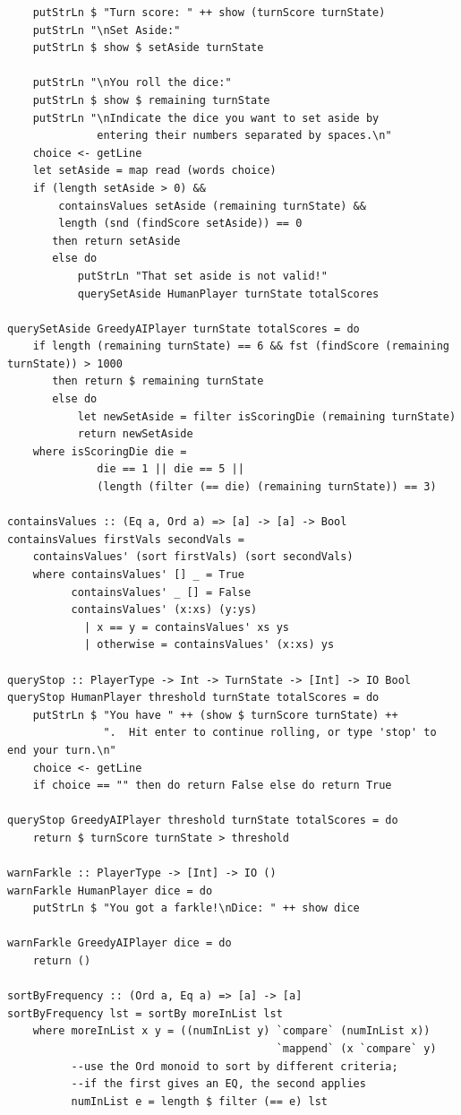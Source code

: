 \documentclass{article}
\begin{document}
\begin{lstlisting}
    putStrLn $ "Turn score: " ++ show (turnScore turnState)
    putStrLn "\nSet Aside:"
    putStrLn $ show $ setAside turnState

    putStrLn "\nYou roll the dice:"
    putStrLn $ show $ remaining turnState
    putStrLn "\nIndicate the dice you want to set aside by
              entering their numbers separated by spaces.\n"
    choice <- getLine
    let setAside = map read (words choice)
    if (length setAside > 0) &&
        containsValues setAside (remaining turnState) &&
        length (snd (findScore setAside)) == 0
       then return setAside
       else do
           putStrLn "That set aside is not valid!"
           querySetAside HumanPlayer turnState totalScores

querySetAside GreedyAIPlayer turnState totalScores = do
    if length (remaining turnState) == 6 && fst (findScore (remaining turnState)) > 1000
       then return $ remaining turnState
       else do
           let newSetAside = filter isScoringDie (remaining turnState)
           return newSetAside
    where isScoringDie die =
              die == 1 || die == 5 ||
              (length (filter (== die) (remaining turnState)) == 3)

containsValues :: (Eq a, Ord a) => [a] -> [a] -> Bool
containsValues firstVals secondVals =
    containsValues' (sort firstVals) (sort secondVals)
    where containsValues' [] _ = True
          containsValues' _ [] = False
          containsValues' (x:xs) (y:ys)
            | x == y = containsValues' xs ys
            | otherwise = containsValues' (x:xs) ys
    
queryStop :: PlayerType -> Int -> TurnState -> [Int] -> IO Bool
queryStop HumanPlayer threshold turnState totalScores = do
    putStrLn $ "You have " ++ (show $ turnScore turnState) ++
               ".  Hit enter to continue rolling, or type 'stop' to end your turn.\n"
    choice <- getLine
    if choice == "" then do return False else do return True

queryStop GreedyAIPlayer threshold turnState totalScores = do
    return $ turnScore turnState > threshold

warnFarkle :: PlayerType -> [Int] -> IO ()
warnFarkle HumanPlayer dice = do
    putStrLn $ "You got a farkle!\nDice: " ++ show dice

warnFarkle GreedyAIPlayer dice = do
    return ()

sortByFrequency :: (Ord a, Eq a) => [a] -> [a]
sortByFrequency lst = sortBy moreInList lst
    where moreInList x y = ((numInList y) `compare` (numInList x))
                                          `mappend` (x `compare` y)
          --use the Ord monoid to sort by different criteria;
          --if the first gives an EQ, the second applies
          numInList e = length $ filter (== e) lst


\end{lstlisting}
\end{document}
